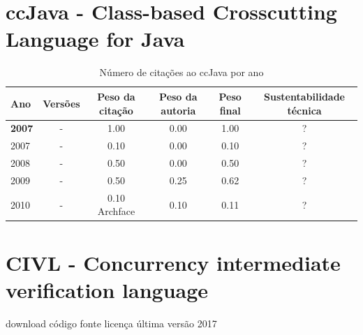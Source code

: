 \section{ccJava - Class-based Crosscutting Language for Java}



\begin{table}[H]
\caption{Número de citações ao ccJava  por ano}
\centering
\begin{tabular}{| l | c | c | c | c | c |}
  \hline
  Ano & Versões & Peso da citação & Peso da autoria & Peso final & Sustentabilidade técnica \\
  \hline
            {\bf 2007}
          &
          -
          &
          1.00
          &
          0.00
          &
            {\color{blue} 1.00}
          &
          ?
          \\
            2007
          &
          -
          &
          0.10
          &
          0.00
          &
            {\color{red} 0.10}
          &
          ?
          \\
\hline
            2008
          &
          -
          &
          0.50
          &
          0.00
          &
            {\color{blue} 0.50}
          &
          ?
          \\
\hline
            2009
          &
          -
          &
          0.50
          &
          0.25
          &
            {\color{blue} 0.62}
          &
          ?
          \\
\hline
            2010
          &
          -
          &
          0.10
            {\tiny Archface}
          &
          0.10
          &
            {\color{red} 0.11}
          &
          ?
          \\
\hline
\end{tabular}
\end{table}



\section{CIVL - Concurrency intermediate verification language}
\checkmark download
\checkmark código fonte
\checkmark licença
\checkmark última versão 2017



